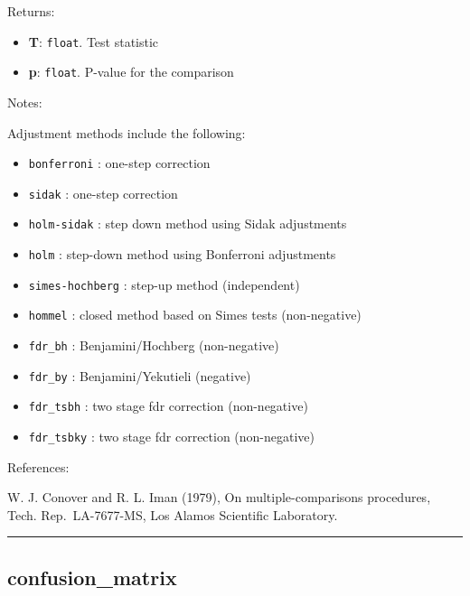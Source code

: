 Returns:

\begin{itemize}
\tightlist
\item
  \textbf{T}: \texttt{float}. Test statistic
\item
  \textbf{p}: \texttt{float}. P-value for the comparison
\end{itemize}

Notes:

Adjustment methods include the following:

\begin{itemize}
\tightlist
\item
  \texttt{bonferroni} : one-step correction
\item
  \texttt{sidak} : one-step correction
\item
  \texttt{holm-sidak} : step down method using Sidak adjustments
\item
  \texttt{holm} : step-down method using Bonferroni adjustments
\item
  \texttt{simes-hochberg} : step-up method (independent)
\item
  \texttt{hommel} : closed method based on Simes tests (non-negative)
\item
  \texttt{fdr\_bh} : Benjamini/Hochberg (non-negative)
\item
  \texttt{fdr\_by} : Benjamini/Yekutieli (negative)
\item
  \texttt{fdr\_tsbh} : two stage fdr correction (non-negative)
\item
  \texttt{fdr\_tsbky} : two stage fdr correction (non-negative)
\end{itemize}

References:

W. J. Conover and R. L. Iman (1979), On multiple-comparisons procedures,
Tech. Rep.~LA-7677-MS, Los Alamos Scientific Laboratory.

\begin{center}\rule{0.5\linewidth}{\linethickness}\end{center}

\subsection{confusion\_matrix}\label{confusion_matrix}

\begin{Shaded}
\begin{Highlighting}[]
\end{Highlighting}
\end{Shaded}

